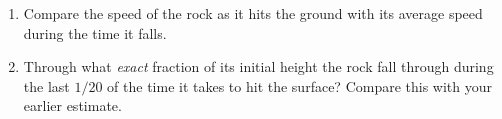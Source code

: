 \documentclass{ximera}
\begin{document}
\begin{question}
\begin{enumerate}
\begin{enumerate}
\item Compare the speed of the rock as it hits the ground with its average speed during the time it falls.

\item Through what \emph{exact} fraction of its initial height the rock fall through during the last $1/20$ of the time it takes to hit the surface? Compare this with your earlier estimate.

\end{enumerate}

\end{enumerate}


\end{question}
\end{document}
